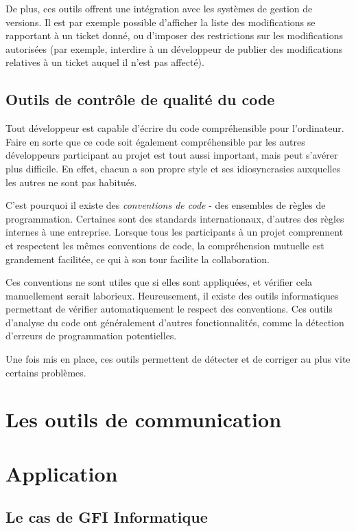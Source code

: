 De plus, ces outils offrent une intégration avec les systèmes de gestion de versions. Il est par exemple possible d’afficher la liste des modifications se rapportant à un ticket donné, ou d’imposer des restrictions sur les modifications autorisées (par exemple, interdire à un développeur de publier des modifications relatives à un ticket auquel il n’est pas affecté).

\subsection{Outils de contrôle de qualité du code}

Tout développeur est capable d’écrire du code compréhensible pour l’ordinateur. Faire en sorte que ce code soit également compréhensible par les autres développeurs participant au projet est tout aussi important, mais peut s’avérer plus difficile. En effet, chacun a son propre style et ses idiosyncrasies auxquelles les autres ne sont pas habitués.

C’est pourquoi il existe des \textit{conventions de code} - des ensembles de règles de programmation. Certaines sont des standards internationaux, d’autres des règles internes à une entreprise. Lorsque tous les participants à un projet comprennent et respectent les mêmes conventions de code, la compréhension mutuelle est grandement facilitée, ce qui à son tour facilite la collaboration.

Ces conventions ne sont utiles que si elles sont appliquées, et vérifier cela manuellement serait laborieux. Heureusement, il existe des outils informatiques permettant de vérifier automatiquement le respect des conventions. Ces outils d’analyse du code ont généralement d’autres fonctionnalités, comme la détection d’erreurs de programmation potentielles.

Une fois mis en place, ces outils permettent de détecter et de corriger au plus vite certains problèmes.

\section{Les outils de communication}



\section{Application}

\subsection{Le cas de GFI Informatique}

